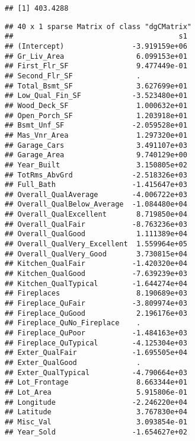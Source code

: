 \documentclass[
]{article}
\newenvironment{Shaded}{\begin{snugshade}}{\end{snugshade}}
\newcommand{\FunctionTok}[1]{\textcolor[rgb]{0.13,0.29,0.53}{\textbf{#1}}}
\newcommand{\NormalTok}[1]{#1}
\newcommand{\OtherTok}[1]{\textcolor[rgb]{0.56,0.35,0.01}{#1}}
\newcommand{\SpecialCharTok}[1]{\textcolor[rgb]{0.81,0.36,0.00}{\textbf{#1}}}
\begin{document}
\begin{Shaded}
\end{Shaded}

\begin{verbatim}
## [1] 403.4288
\end{verbatim}

\begin{Shaded}
\end{Shaded}

\begin{verbatim}
## 40 x 1 sparse Matrix of class "dgCMatrix"
##                                       s1
## (Intercept)                -3.919159e+06
## Gr_Liv_Area                 6.099153e+01
## First_Flr_SF                9.477449e-01
## Second_Flr_SF               .           
## Total_Bsmt_SF               3.627699e+01
## Low_Qual_Fin_SF            -3.523480e+01
## Wood_Deck_SF                1.000632e+01
## Open_Porch_SF               1.203918e+01
## Bsmt_Unf_SF                -2.059528e+01
## Mas_Vnr_Area                1.297320e+01
## Garage_Cars                 3.491107e+03
## Garage_Area                 9.740129e+00
## Year_Built                  3.150805e+02
## TotRms_AbvGrd              -2.518326e+03
## Full_Bath                  -1.415647e+03
## Overall_QualAverage        -4.006722e+03
## Overall_QualBelow_Average  -1.084480e+04
## Overall_QualExcellent       8.719850e+04
## Overall_QualFair           -8.763236e+03
## Overall_QualGood            1.111389e+04
## Overall_QualVery_Excellent  1.559964e+05
## Overall_QualVery_Good       3.730815e+04
## Kitchen_QualFair           -1.420320e+04
## Kitchen_QualGood           -7.639239e+03
## Kitchen_QualTypical        -1.644274e+04
## Fireplaces                  8.190689e+03
## Fireplace_QuFair           -3.809974e+03
## Fireplace_QuGood            2.196176e+03
## Fireplace_QuNo_Fireplace    .           
## Fireplace_QuPoor           -1.484163e+03
## Fireplace_QuTypical        -4.125304e+03
## Exter_QualFair             -1.695505e+04
## Exter_QualGood              .           
## Exter_QualTypical          -4.790664e+03
## Lot_Frontage                8.663344e+01
## Lot_Area                    5.915806e-01
## Longitude                  -2.246220e+04
## Latitude                    3.767830e+04
## Misc_Val                    3.093854e-01
## Year_Sold                  -1.654627e+02
\end{verbatim}
\end{document}
